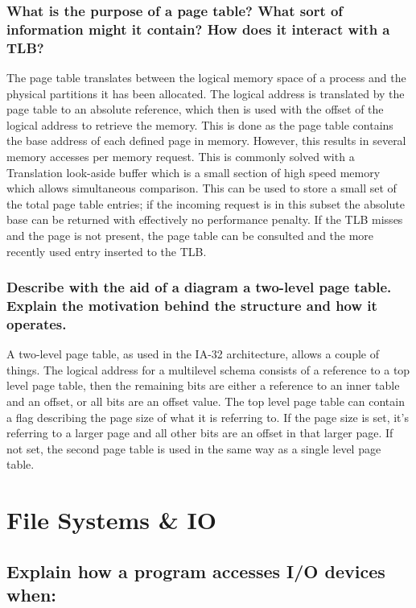 \documentclass[]{article}
\begin{document}
        \subsubsection{What is the purpose of a page table? What sort of information might it contain? How does it interact with a TLB?}

        The page table translates between the logical memory space of a process and the physical partitions it has been allocated. The logical address is translated by the page table to an absolute reference, which then is used with the offset of the logical address to retrieve the memory. This is done as the page table contains the base address of each defined page in memory. However, this results in several memory accesses per memory request. This is commonly solved with a Translation look-aside buffer which is a small section of high speed memory which allows simultaneous comparison. This can be used to store a small set of the total page table entries; if the incoming request is in this subset the absolute base can be returned with effectively no performance penalty. If the TLB misses and the page is not present, the page table can be consulted and the more recently used entry inserted to the TLB.

        \subsubsection{Describe with the aid of a diagram a two-level page table. Explain the motivation behind the structure and how it operates.}

        A two-level page table, as used in the IA-32 architecture, allows a couple of things. The logical address for a multilevel schema consists of a reference to a top level page table, then the remaining bits are either a reference to an inner table and an offset, or all bits are an offset value. The top level page table can contain a flag describing the page size of what it is referring to. If the page size is set, it's referring to a larger page and all other bits are an offset in that larger page. If not set, the second page table is used in the same way as a single level page table.


\newpage
\section{File Systems \& IO}

    \subsection{Explain how a program accesses I/O devices when:}
\end{document}
